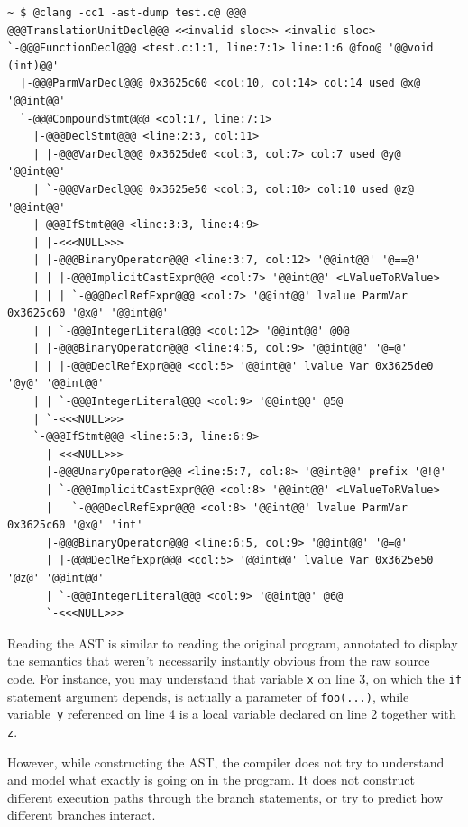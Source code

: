 \documentclass[a4paper,12pt]{article}
\newenvironment{nobr}{\begin{minipage}{\textwidth}\setlength\parskip{1em}
}{\end{minipage}\ignorespacesafterend}
\begin{document}
\begin{nobr}
\begin{lstlisting}[style=commandline]
~ $ @clang -cc1 -ast-dump test.c@ @@@
@@@TranslationUnitDecl@@@ <<invalid sloc>> <invalid sloc>
`-@@@FunctionDecl@@@ <test.c:1:1, line:7:1> line:1:6 @foo@ '@@void (int)@@'
  |-@@@ParmVarDecl@@@ 0x3625c60 <col:10, col:14> col:14 used @x@ '@@int@@'
  `-@@@CompoundStmt@@@ <col:17, line:7:1>
    |-@@@DeclStmt@@@ <line:2:3, col:11>
    | |-@@@VarDecl@@@ 0x3625de0 <col:3, col:7> col:7 used @y@ '@@int@@'
    | `-@@@VarDecl@@@ 0x3625e50 <col:3, col:10> col:10 used @z@ '@@int@@'
    |-@@@IfStmt@@@ <line:3:3, line:4:9>
    | |-<<<NULL>>>
    | |-@@@BinaryOperator@@@ <line:3:7, col:12> '@@int@@' '@==@'
    | | |-@@@ImplicitCastExpr@@@ <col:7> '@@int@@' <LValueToRValue>
    | | | `-@@@DeclRefExpr@@@ <col:7> '@@int@@' lvalue ParmVar 0x3625c60 '@x@' '@@int@@'
    | | `-@@@IntegerLiteral@@@ <col:12> '@@int@@' @0@
    | |-@@@BinaryOperator@@@ <line:4:5, col:9> '@@int@@' '@=@'
    | | |-@@@DeclRefExpr@@@ <col:5> '@@int@@' lvalue Var 0x3625de0 '@y@' '@@int@@'
    | | `-@@@IntegerLiteral@@@ <col:9> '@@int@@' @5@
    | `-<<<NULL>>>
    `-@@@IfStmt@@@ <line:5:3, line:6:9>
      |-<<<NULL>>>
      |-@@@UnaryOperator@@@ <line:5:7, col:8> '@@int@@' prefix '@!@'
      | `-@@@ImplicitCastExpr@@@ <col:8> '@@int@@' <LValueToRValue>
      |   `-@@@DeclRefExpr@@@ <col:8> '@@int@@' lvalue ParmVar 0x3625c60 '@x@' 'int'
      |-@@@BinaryOperator@@@ <line:6:5, col:9> '@@int@@' '@=@'
      | |-@@@DeclRefExpr@@@ <col:5> '@@int@@' lvalue Var 0x3625e50 '@z@' '@@int@@'
      | `-@@@IntegerLiteral@@@ <col:9> '@@int@@' @6@
      `-<<<NULL>>>
\end{lstlisting}
\end{nobr}

Reading the AST is similar to reading the original program, annotated to display the semantics that weren't necessarily instantly obvious from the raw source code. For instance, you may understand that variable \lstinline|x| on line 3, on which the \lstinline|if| statement argument depends, is actually a parameter of \lstinline|foo(...)|, while variable~\lstinline|y| referenced on line 4 is a local variable declared on line 2 together with \lstinline|z|.

However, while constructing the AST, the compiler does not try to understand and model what exactly is going on in the program. It does not construct different execution paths through the branch statements, or try to predict how different branches interact.
\end{document}
